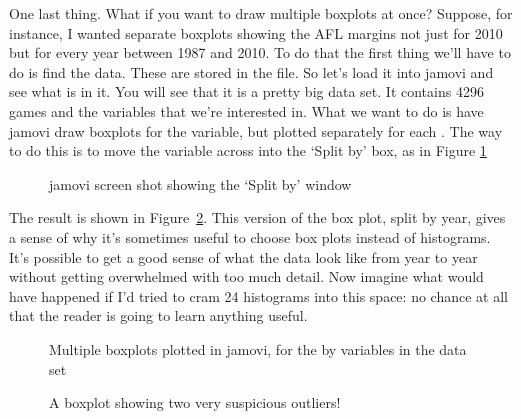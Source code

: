 One last thing. What if you want to draw multiple boxplots at once? Suppose, for instance, I wanted separate boxplots showing the AFL margins not just for 2010 but for every year between 1987 and 2010. To do that the first thing we'll have to do is find the data. These are stored in the  file. So let's load it into jamovi and see what is in it. You will see that it is a pretty big data set. It contains 4296 games and the variables that we're interested in. What we want to do is have jamovi draw boxplots for the  variable, but plotted separately for each  . The way to do this is to move the  variable across into the `Split by' box, as in Figure \ref{fig:splitfile1}

\begin{figure}[!!htb]
\begin{center}
\caption{jamovi screen shot showing the `Split by' window}
\label{fig:splitfile1}
\HR
\end{center}
\end{figure}

The result is shown in Figure~\ref{fig:boxplot3}. This version of the box plot, split by year, gives a sense of why it's sometimes useful to choose box plots instead of histograms. It's possible to get a good sense of what the data look like from year to year without getting overwhelmed with too much detail. Now imagine what would have happened if I'd tried to cram 24 histograms into this space: no chance at all that the reader is going to learn anything useful.

\begin{figure}[!!htb]
\begin{center}
\caption{Multiple boxplots plotted in jamovi, for the  by  variables in the  data set}
\label{fig:boxplot3}
\HR
\end{center}
\end{figure}


\begin{figure}[!!htb]
\begin{center}
\caption{A boxplot showing two very suspicious outliers!}
\label{fig:boxplot4}
\HR
\end{center}
\end{figure}

